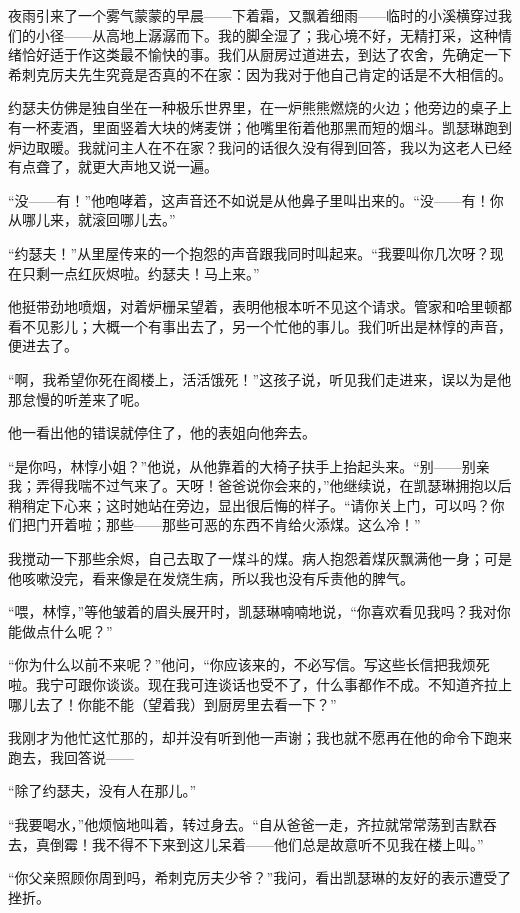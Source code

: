 \par 夜雨引来了一个雾气蒙蒙的早晨——下着霜，又飘着细雨——临时的小溪横穿过我们的小径——从高地上潺潺而下。我的脚全湿了；我心境不好，无精打采，这种情绪恰好适于作这类最不愉快的事。我们从厨房过道进去，到达了农舍，先确定一下希刺克厉夫先生究竟是否真的不在家：因为我对于他自己肯定的话是不大相信的。
\par 约瑟夫仿佛是独自坐在一种极乐世界里，在一炉熊熊燃烧的火边；他旁边的桌子上有一杯麦酒，里面竖着大块的烤麦饼；他嘴里衔着他那黑而短的烟斗。凯瑟琳跑到炉边取暖。我就问主人在不在家？我问的话很久没有得到回答，我以为这老人已经有点聋了，就更大声地又说一遍。
\par “没——有！”他咆哮着，这声音还不如说是从他鼻子里叫出来的。“没——有！你从哪儿来，就滚回哪儿去。”
\par “约瑟夫！”从里屋传来的一个抱怨的声音跟我同时叫起来。“我要叫你几次呀？现在只剩一点红灰烬啦。约瑟夫！马上来。”
\par 他挺带劲地喷烟，对着炉栅呆望着，表明他根本听不见这个请求。管家和哈里顿都看不见影儿；大概一个有事出去了，另一个忙他的事儿。我们听出是林惇的声音，便进去了。
\par “啊，我希望你死在阁楼上，活活饿死！”这孩子说，听见我们走进来，误以为是他那怠慢的听差来了呢。
\par 他一看出他的错误就停住了，他的表姐向他奔去。
\par “是你吗，林惇小姐？”他说，从他靠着的大椅子扶手上抬起头来。“别——别亲我；弄得我喘不过气来了。天呀！爸爸说你会来的，”他继续说，在凯瑟琳拥抱以后稍稍定下心来；这时她站在旁边，显出很后悔的样子。“请你关上门，可以吗？你们把门开着啦；那些——那些可恶的东西不肯给火添煤。这么冷！”
\par 我搅动一下那些余烬，自己去取了一煤斗的煤。病人抱怨着煤灰飘满他一身；可是他咳嗽没完，看来像是在发烧生病，所以我也没有斥责他的脾气。
\par “喂，林惇，”等他皱着的眉头展开时，凯瑟琳喃喃地说，“你喜欢看见我吗？我对你能做点什么呢？”
\par “你为什么以前不来呢？”他问，“你应该来的，不必写信。写这些长信把我烦死啦。我宁可跟你谈谈。现在我可连谈话也受不了，什么事都作不成。不知道齐拉上哪儿去了！你能不能（望着我）到厨房里去看一下？”
\par 我刚才为他忙这忙那的，却并没有听到他一声谢；我也就不愿再在他的命令下跑来跑去，我回答说——
\par “除了约瑟夫，没有人在那儿。”
\par “我要喝水，”他烦恼地叫着，转过身去。“自从爸爸一走，齐拉就常常荡到吉默吞去，真倒霉！我不得不下来到这儿呆着——他们总是故意听不见我在楼上叫。”
\par “你父亲照顾你周到吗，希刺克厉夫少爷？”我问，看出凯瑟琳的友好的表示遭受了挫折。

